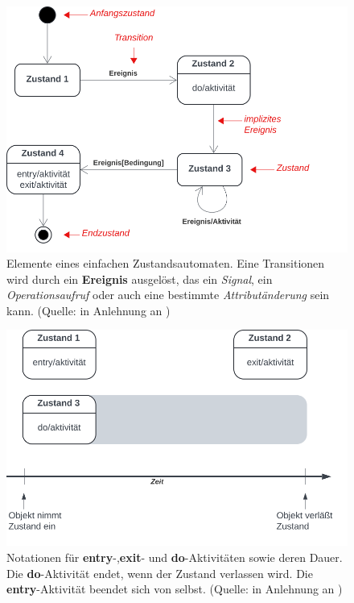 \begin{figure}
    \centering
    \includegraphics[scale=0.4]{part three/Zustandsautomaten/img/statechartdiagramnotation}
    \caption{Elemente eines einfachen Zustandsautomaten. Eine Transitionen wird durch ein \textbf{Ereignis} ausgelöst, das ein \textit{Signal}, ein \textit{Operationsaufruf} oder auch eine bestimmte \textit{Attributänderung} sein kann. (Quelle: in Anlehnung an \cite[90, Abb. 2.11-6]{Bal05})}
    \label{fig:statechartdiagramnotation-cc}
\end{figure}

\begin{figure}
  \centering
  \includegraphics[scale=0.4]{part three/Zustandsautomaten/img/entryexitdo}
  \caption{Notationen für \textbf{entry}-,\textbf{exit}- und \textbf{do}-Aktivitäten sowie deren Dauer. Die \textbf{do}-Aktivität endet, wenn der Zustand verlassen wird. Die \textbf{entry}-Aktivität beendet sich von selbst. (Quelle: in Anlehnung an \cite[89, Abb. 2.11-3]{Bal05})}
  \label{fig:entryexitdo-cc}
\end{figure}

